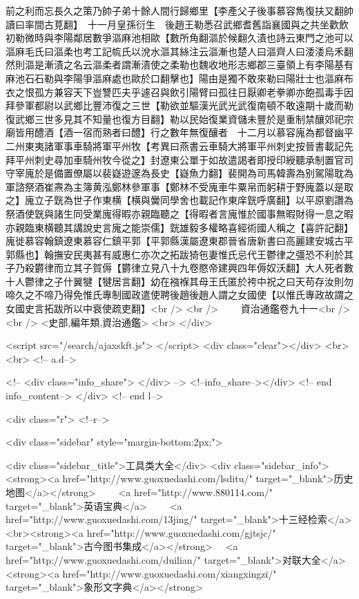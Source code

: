 前之利而忘長久之策乃帥子弟十餘人間行歸鄉里【李產父子後事慕容雋復扶又翻帥讀曰率間古莧翻】　十一月皇孫衍生　後趙王勒悉召武鄉耆舊詣襄國與之共坐歡飲初勒微時與李陽鄰居數爭漚麻池相歐【數所角翻漚於候翻久漬也詩云東門之池可以漚麻毛氏曰漚柔也考工記㡆氏以涗水漚其絲注云漚漸也楚人曰漚齊人曰涹涹烏禾翻然則漚是漸漬之名云漚柔者謂漸漬使之柔勒也魏收地形志鄉郡三臺領上有李陽基有麻池石石勒與李陽爭漚麻處也歐於口翻擊也】陽由是獨不敢來勒曰陽壯士也漚麻布衣之恨孤方兼容天下豈讐匹夫乎遽召與飲引陽臂曰孤往日厭卿老拳卿亦飽孤毒手因拜參軍都尉以武鄉比豐沛復之三世【勒欲並驅漢光武光武復南頓不敢遠期十歲而勒復武鄉三世多見其不知量也復方目翻】勒以民始復業資儲未豐於是重制禁釀郊祀宗廟皆用醴酒【酒一宿而熟者曰醴】行之數年無復釀者　十二月以慕容廆為都督幽平二州東夷諸軍事車騎將軍平州牧【考異曰燕書云車騎大將軍平州刺史按晉書載記先拜平州刺史尋加車騎州牧今從之】封遼東公單于如故遣謁者即授印綬聽承制置官司守宰廆於是備置僚屬以裴嶷遊邃為長史【嶷魚力翻】裴開為司馬韓壽為别駕陽耽為軍諮祭酒崔燾為主簿黄泓鄭林參軍事【鄭林不受廆車牛粟帛而躬耕于野廆蓋以是取之】廆立子皝為世子作東横【横與黌同學舍也載記作東庠皝呼廣翻】以平原劉讚為祭酒使皝與諸生同受業廆得暇亦親臨聽之【得暇者言廆惟於國事無暇財得一息之暇亦親臨東横聽其講說史言廆之能崇儒】皝雄毅多權略喜經術國人稱之【喜許記翻】廆徙慕容翰鎮遼東慕容仁鎮平郭【平郭縣漢屬遼東郡晉省唐新書曰高麗建安城古平郭縣也】翰撫安民夷甚有威惠仁亦次之拓跋猗㐌妻惟氏忌代王鬱律之彊恐不利於其子乃殺欝律而立其子賀傉【欝律立見八十九卷愍帝建興四年傉奴沃翻】大人死者數十人鬱律之子什翼犍【犍居言翻】幼在襁褓其母王氏匿於袴中祝之曰天苟存汝則勿啼久之不啼乃得免惟氏專制國政遣使聘後趙後趙人謂之女國使【以惟氏專政故謂之女國史言拓跋所以中衰使疏吏翻】<br />
<br />
　　資治通鑑卷九十一<br />
<br />
<史部,編年類,資治通鑑>  <br>
   </div> 

<script src="/search/ajaxskft.js"> </script>
 <div class="clear"></div>
<br>
<br>
 <!-- a.d-->

 <!--
<div class="info_share">
</div> 
-->
 <!--info_share--></div>   <!-- end info_content-->
  </div> <!-- end l-->

<div class="r">   <!--r-->



<div class="sidebar"  style="margin-bottom:2px;">

 
<div class="sidebar_title">工具类大全</div>
<div class="sidebar_info">
<strong><a href="http://www.guoxuedashi.com/lsditu/" target="_blank">历史地图</a></strong>　　
<a href="http://www.880114.com/" target="_blank">英语宝典</a>　　
<a href="http://www.guoxuedashi.com/13jing/" target="_blank">十三经检索</a>　
<br><strong><a href="http://www.guoxuedashi.com/gjtsjc/" target="_blank">古今图书集成</a></strong>　
<a href="http://www.guoxuedashi.com/duilian/" target="_blank">对联大全</a>　<strong><a href="http://www.guoxuedashi.com/xiangxingzi/" target="_blank">象形文字典</a></strong>　

